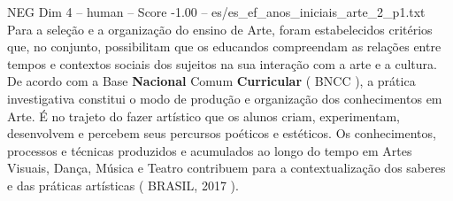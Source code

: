 \begin{textsample}{NEG Dim 4 – human – Score -1.00 – es/es\_ef\_anos\_iniciais\_arte\_2\_p1.txt}  \label{ex:f4_neg_016}
Para a seleção e a organização do ensino de Arte, foram estabelecidos critérios que, no conjunto, possibilitam que os educandos compreendam as relações entre tempos e contextos sociais dos sujeitos na sua interação com a arte e a cultura.
De acordo com a Base \textbf{Nacional} Comum \textbf{Curricular} ( BNCC ), a prática investigativa constitui o modo de produção e organização dos conhecimentos em Arte. É no trajeto do fazer artístico que os alunos criam, experimentam, desenvolvem e percebem seus percursos poéticos e estéticos.
Os conhecimentos, processos e técnicas produzidos e acumulados ao longo do tempo em Artes Visuais, Dança, Música e Teatro contribuem para a contextualização dos saberes e das práticas artísticas ( BRASIL, 2017 ).

\end{textsample}
